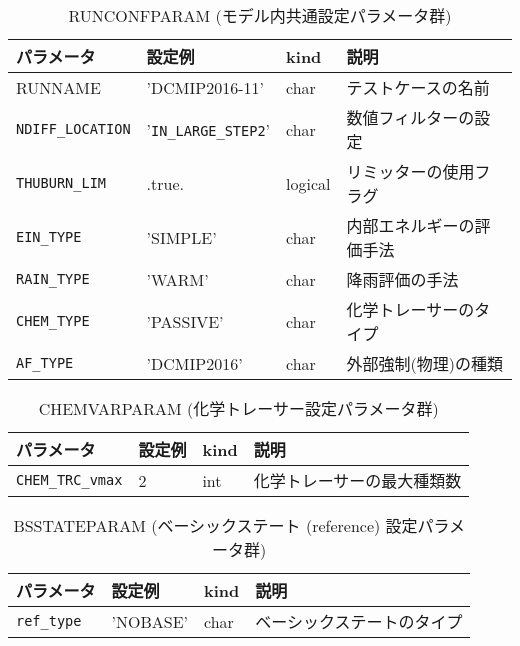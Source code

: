 \begin{table}[htb]
\begin{center}
\caption{RUNCONFPARAM (モデル内共通設定パラメータ群)}
\begin{tabularx}{150mm}{|l|l|l|X|} \hline
 \rowcolor[gray]{0.9} パラメータ & 設定例 & kind & 説明          \\ \hline
 RUNNAME               & 'DCMIP2016-11'   & char & テストケースの名前 \\ \hline
 \verb|NDIFF_LOCATION|        & '\verb|IN_LARGE_STEP2|' & char  & 数値フィルターの設定 \\ \hline
 \verb|THUBURN_LIM|           & .true.      & logical & リミッターの使用フラグ \\ \hline
 \verb|EIN_TYPE|              & 'SIMPLE'    & char  & 内部エネルギーの評価手法 \\ \hline
 \verb|RAIN_TYPE|             & 'WARM'      & char & 降雨評価の手法 \\ \hline
 \verb|CHEM_TYPE|             & 'PASSIVE'   & char & 化学トレーサーのタイプ \\ \hline
 \verb|AF_TYPE|               & 'DCMIP2016' & char & 外部強制(物理)の種類 \\ \hline
\end{tabularx}
\end{center}
\end{table}

\begin{table}[htb]
\begin{center}
\caption{CHEMVARPARAM (化学トレーサー設定パラメータ群)}
\begin{tabularx}{150mm}{|l|l|l|X|} \hline
 \rowcolor[gray]{0.9} パラメータ & 設定例 & kind & 説明          \\ \hline
 \verb|CHEM_TRC_vmax| & 2 & int &  化学トレーサーの最大種類数 \\ \hline
\end{tabularx}
\end{center}
\end{table}

\begin{table}[htb]
\begin{center}
\caption{BSSTATEPARAM (ベーシックステート (reference) 設定パラメータ群)}
\begin{tabularx}{150mm}{|l|l|l|X|} \hline
 \rowcolor[gray]{0.9} パラメータ & 設定例 & kind & 説明          \\ \hline
 \verb|ref_type| & 'NOBASE' & char & ベーシックステートのタイプ \\ \hline
\end{tabularx}
\end{center}
\end{table}

